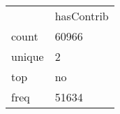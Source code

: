 \begin{tabular}{ll}
 & hasContrib \\
count & 60966 \\
unique & 2 \\
top & no \\
freq & 51634 \\
\end{tabular}
